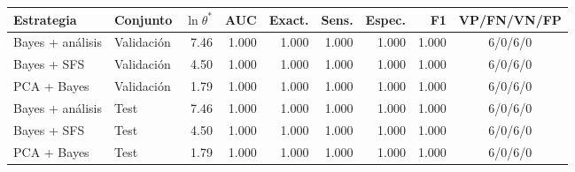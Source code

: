 \footnotesize
\begin{tabular}{llrrrrrrc}
\toprule
Estrategia & Conjunto & $\ln\theta^*$ & AUC & Exact. & Sens. & Espec. & F1 & VP/FN/VN/FP \\
\midrule
Bayes + análisis & Validación & 7.46 & 1.000 & 1.000 & 1.000 & 1.000 & 1.000 & 6/0/6/0 \\
Bayes + SFS & Validación & 4.50 & 1.000 & 1.000 & 1.000 & 1.000 & 1.000 & 6/0/6/0 \\
PCA + Bayes & Validación & 1.79 & 1.000 & 1.000 & 1.000 & 1.000 & 1.000 & 6/0/6/0 \\
\midrule
Bayes + análisis & Test & 7.46 & 1.000 & 1.000 & 1.000 & 1.000 & 1.000 & 6/0/6/0 \\
Bayes + SFS & Test & 4.50 & 1.000 & 1.000 & 1.000 & 1.000 & 1.000 & 6/0/6/0 \\
PCA + Bayes & Test & 1.79 & 1.000 & 1.000 & 1.000 & 1.000 & 1.000 & 6/0/6/0 \\
\bottomrule
\end{tabular}

